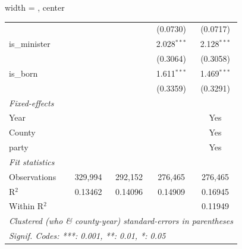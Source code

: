 \begin{adjustbox}{width = \textwidth, center}
\begin{tabular}{lcccc}
                                                       &                &                & (0.0730)        & (0.0717)\\   
      is\_minister                                     &                &                & 2.028$^{***}$   & 2.128$^{***}$\\   
                                                       &                &                & (0.3064)        & (0.3058)\\   
      is\_born                                         &                &                & 1.611$^{***}$   & 1.469$^{***}$\\   
                                                       &                &                & (0.3359)        & (0.3291)\\   
      \midrule
      \emph{Fixed-effects}\\
      Year                                             &                &                &                 & Yes\\  
      County                                           &                &                &                 & Yes\\  
      party                                            &                &                &                 & Yes\\  
      \midrule
      \emph{Fit statistics}\\
      Observations                                     & 329,994        & 292,152        & 276,465         & 276,465\\  
      R$^2$                                            & 0.13462        & 0.14096        & 0.14909         & 0.16945\\  
      Within R$^2$                                     &                &                &                 & 0.11949\\  
      \midrule \midrule
      \multicolumn{5}{l}{\emph{Clustered (who \& county-year) standard-errors in parentheses}}\\
      \multicolumn{5}{l}{\emph{Signif. Codes: ***: 0.001, **: 0.01, *: 0.05}}\\
   \end{tabular}
\end{adjustbox}
\par\endgroup


